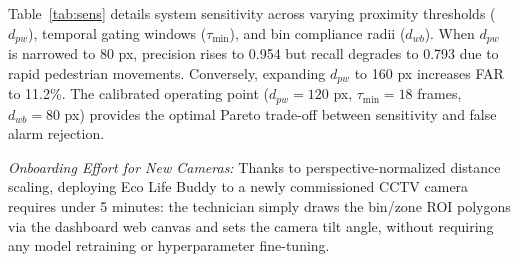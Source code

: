 \documentclass[conference]{IEEEtran}
\begin{document}
\begin{table}[htbp]
\centering
\caption{Sensitivity Analysis Across Spatial and Temporal Parameters}
\label{tab:sens}
\end{table}

Table~\ref{tab:sens} details system sensitivity across varying proximity thresholds ($d_{pw}$), temporal gating windows ($\tau_{\min}$), and bin compliance radii ($d_{wb}$). When $d_{pw}$ is narrowed to 80 px, precision rises to 0.954 but recall degrades to 0.793 due to rapid pedestrian movements. Conversely, expanding $d_{pw}$ to 160 px increases FAR to 11.2\%. The calibrated operating point ($d_{pw} = 120$ px, $\tau_{\min} = 18$ frames, $d_{wb} = 80$ px) provides the optimal Pareto trade-off between sensitivity and false alarm rejection.

\textit{Onboarding Effort for New Cameras:} Thanks to perspective-normalized distance scaling, deploying Eco Life Buddy to a newly commissioned CCTV camera requires under 5 minutes: the technician simply draws the bin/zone ROI polygons via the dashboard web canvas and sets the camera tilt angle, without requiring any model retraining or hyperparameter fine-tuning.
\end{document}
